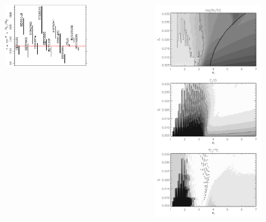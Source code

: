 {{\begin{columns}[t,onlytextwidth]
\begin{center}
    \includegraphics[width=0.6\textwidth,height=!]{./A/fig_all.pdf}
\end{center}



  \begin{center}
    \includegraphics[width=0.7\textwidth,height=!]{./A/mz.pdf}   
  \end{center}
\end{columns}

}}
